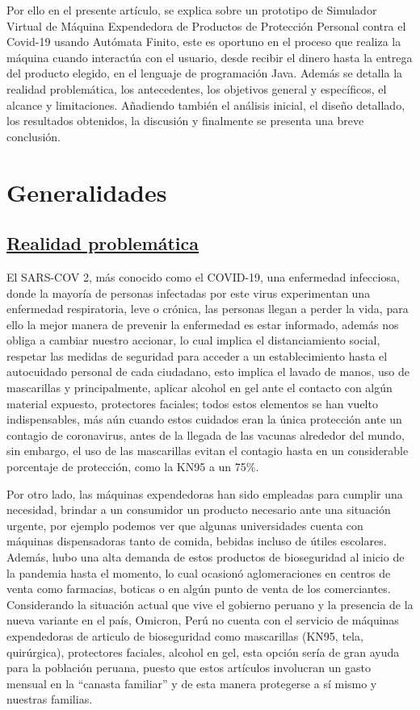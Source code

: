 \documentclass[10pt,conference]{IEEEtran}
\begin{document}
Por ello en el presente artículo, se explica sobre un prototipo de Simulador Virtual de Máquina Expendedora de Productos de Protección Personal contra el Covid-19 usando Autómata Finito, este es oportuno en el proceso que realiza la máquina cuando interactúa con el usuario, desde recibir el dinero hasta la entrega del producto elegido, en el lenguaje de programación Java. Además se detalla la realidad problemática, los antecedentes, los objetivos general y específicos, el alcance y limitaciones. Añadiendo también el análisis inicial, el diseño detallado, los resultados obtenidos, la discusión y finalmente se presenta una breve conclusión.

\vspace{1mm}    
\section{\textbf{Generalidades}}

\vspace{2mm}
\subsection{\underline{\textbf{Realidad problemática}}}

El SARS-COV 2, más conocido como el COVID-19, una enfermedad infecciosa, donde la mayoría de personas infectadas por este virus experimentan una enfermedad respiratoria, leve o crónica, las personas llegan a perder la vida, para ello la mejor manera de prevenir la enfermedad es estar informado, además nos obliga a cambiar nuestro accionar, lo cual implica el distanciamiento social, respetar las medidas de seguridad para acceder a un establecimiento hasta el autocuidado personal de cada ciudadano, esto implica el lavado de manos, uso de mascarillas y principalmente, aplicar alcohol en gel ante el contacto con algún material expuesto, protectores faciales; todos estos elementos se han vuelto indispensables, más aún cuando estos cuidados eran la única protección ante un contagio de coronavirus, antes de la llegada de las vacunas alrededor del mundo, sin embargo, el uso de las mascarillas evitan el contagio hasta en un considerable porcentaje de protección, como la KN95 a un 75\%.

Por otro lado, las máquinas expendedoras han sido empleadas para cumplir una necesidad, brindar a un consumidor un producto necesario ante una situación urgente, por ejemplo podemos ver que algunas universidades cuenta con máquinas dispensadoras tanto de comida, bebidas incluso de útiles escolares.  Además, hubo una alta demanda de estos productos de bioseguridad al inicio de la pandemia hasta el momento, lo cual ocasionó aglomeraciones en centros de venta como farmacias, boticas o en algún punto de venta de los comerciantes. Considerando la situación actual que vive el gobierno peruano y la presencia de la nueva variante en el país, Omicron, Perú no cuenta con el servicio de máquinas expendedoras de articulo de bioseguridad como mascarillas (KN95, tela, quirúrgica), protectores faciales, alcohol en gel, esta opción sería de gran ayuda para la población peruana, puesto que estos artículos involucran un gasto mensual en la “canasta familiar” y de esta manera protegerse a sí mismo y nuestras familias.
\end{document}
